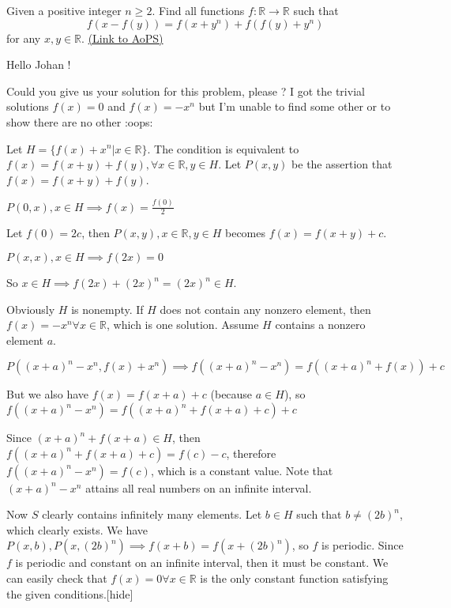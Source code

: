 \begin{problem}
	Given a positive integer $n\ge2$. Find all functions $f:\mathbb{R}\rightarrow\mathbb{R}$ such that \[f(x-f(y))=f(x+y^n)+f(f(y)+y^n)\] for any $x,y\in\mathbb{R}$.
	\flushright \href{https://artofproblemsolving.com/community/c6h398427}{(Link to AoPS)}
\end{problem}



\begin{solution}
	Hello Johan !

Could you give us your solution for this problem, please ?
I got the trivial solutions $f(x)=0$ and $f(x)=-x^n$  but I'm unable to find some other or to show there are no other  :oops:
\end{solution}



\begin{solution}Let $H=\{f(x)+x^n|x\in\mathbb{R}\}$. The condition is equivalent to $f(x)=f(x+y)+f(y),\forall x\in\mathbb{R},y\in H$. Let $P(x,y)$ be the assertion that $f(x)=f(x+y)+f(y)$.

$P(0,x),x\in H\implies f(x)=\frac{f(0)}2$

Let $f(0)=2c$, then $P(x,y),x\in\mathbb{R},y\in H$ becomes $f(x)=f(x+y)+c$.

$P(x,x),x\in H\implies f(2x)=0$

So $x\in H\implies f(2x)+(2x)^n=(2x)^n\in H$.

Obviously $H$ is nonempty. If $H$ does not contain any nonzero element, then $\boxed{f(x)=-x^n\forall x\in\mathbb{R}}$, which is one solution. Assume $H$ contains a nonzero element $a$.

$P((x+a)^n-x^n,f(x)+x^n)\implies f((x+a)^n-x^n)=f((x+a)^n+f(x))+c$

But we also have $f(x)=f(x+a)+c$ (because $a\in H$), so $f((x+a)^n-x^n)=f((x+a)^n+f(x+a)+c)+c$

Since $(x+a)^n+f(x+a)\in H$, then $f((x+a)^n+f(x+a)+c)=f(c)-c$, therefore $f((x+a)^n-x^n)=f(c)$, which is a constant value. Note that $(x+a)^n-x^n$ attains all real numbers on an infinite interval.

Now $S$ clearly contains infinitely many elements. Let $b\in H$ such that $b\ne(2b)^n$, which clearly exists. We have $P(x,b),P(x,(2b)^n)\implies f(x+b)=f(x+(2b)^n)$, so $f$ is periodic. Since $f$ is periodic and constant on an infinite interval, then it must be constant. We can easily check that $\boxed{f(x)=0\forall x\in\mathbb{R}}$ is the only constant function satisfying the given conditions.[\/hide]
\end{solution}




